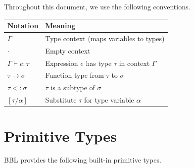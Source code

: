 \documentclass[11pt, letterpaper]{article}
\newcommand{\hastype}[3]{#1 \vdash #2 : #3}
\newcommand{\ctx}{\Gamma}
\newcommand{\emptyctx}{\cdot}
\newcommand{\tvar}{\alpha}          %
\newcommand{\typ}{\tau}             %
\newcommand{\typB}{\sigma}          %
\newcommand{\tarrow}[2]{#1 \to #2}             %
\newcommand{\subtype}{\mathrel{<:}}
\newcommand{\subst}[2]{[#1 / #2]}
\begin{document}
Throughout this document, we use the following conventions.

\begin{center}
\begin{tabular}{ll}
  \toprule
  \textbf{Notation} & \textbf{Meaning} \\
  \midrule
  $\ctx$                          & Type context (maps variables to types) \\
  $\emptyctx$                     & Empty context \\
  $\hastype{\ctx}{e}{\typ}$       & Expression $e$ has type $\typ$ in context $\ctx$ \\
  $\tarrow{\typ}{\typB}$          & Function type from $\typ$ to $\typB$ \\
  $\typ \subtype \typB$           & $\typ$ is a subtype of $\typB$ \\
  $\subst{\typ}{\tvar}$           & Substitute $\typ$ for type variable $\tvar$ \\
  \bottomrule
\end{tabular}
\end{center}

\section{Primitive Types}

BBL provides the following built-in primitive types.
\end{document}
